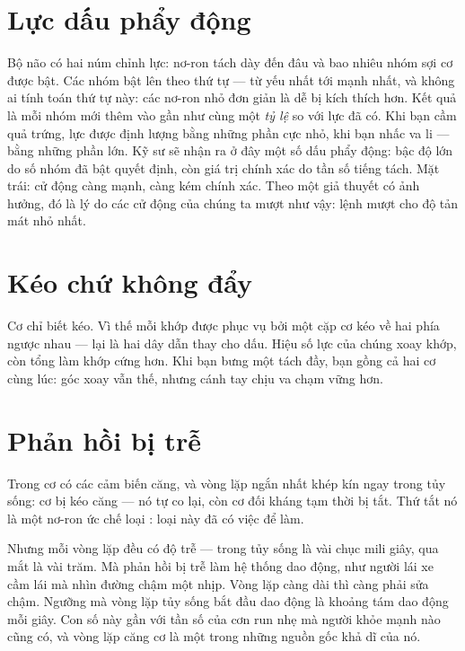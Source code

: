 \section*{Lực dấu phẩy động}

Bộ não có hai núm chỉnh lực: nơ-ron tách dày đến đâu và bao nhiêu nhóm sợi cơ được bật. Các nhóm bật lên theo thứ tự --- từ yếu nhất tới mạnh nhất, và không ai tính toán thứ tự này: các nơ-ron nhỏ đơn giản là dễ bị kích thích hơn. Kết quả là mỗi nhóm mới thêm vào gần như cùng một \emph{tỷ lệ} so với lực đã có. Khi bạn cầm quả trứng, lực được định lượng bằng những phần cực nhỏ, khi bạn nhấc va li --- bằng những phần lớn. Kỹ sư sẽ nhận ra ở đây một số dấu phẩy động: bậc độ lớn do số nhóm đã bật quyết định, còn giá trị chính xác do tần số tiếng tách. Mặt trái: cử động càng mạnh, càng kém chính xác. Theo một giả thuyết có ảnh hưởng, đó là lý do các cử động của chúng ta mượt như vậy: lệnh mượt cho độ tản mát nhỏ nhất.

\section*{Kéo chứ không đẩy}

Cơ chỉ biết kéo. Vì thế mỗi khớp được phục vụ bởi một cặp cơ kéo về hai phía ngược nhau --- lại là hai dây dẫn thay cho dấu. Hiệu số lực của chúng xoay khớp, còn tổng làm khớp cứng hơn. Khi bạn bưng một tách đầy, bạn gồng cả hai cơ cùng lúc: góc xoay vẫn thế, nhưng cánh tay chịu va chạm vững hơn.


\section*{Phản hồi bị trễ}

Trong cơ có các cảm biến căng, và vòng lặp ngắn nhất khép kín ngay trong tủy sống: cơ bị kéo căng --- nó tự co lại, còn cơ đối kháng tạm thời bị tắt. Thứ tắt nó là một nơ-ron ức chế loại : loại này đã có việc để làm.

Nhưng mỗi vòng lặp đều có độ trễ --- trong tủy sống là vài chục mili giây, qua mắt là vài trăm. Mà phản hồi bị trễ làm hệ thống dao động, như người lái xe cầm lái mà nhìn đường chậm một nhịp. Vòng lặp càng dài thì càng phải sửa chậm. Ngưỡng mà vòng lặp tủy sống bắt đầu dao động là khoảng tám dao động mỗi giây. Con số này gần với tần số của cơn run nhẹ mà người khỏe mạnh nào cũng có, và vòng lặp căng cơ là một trong những nguồn gốc khả dĩ của nó.

